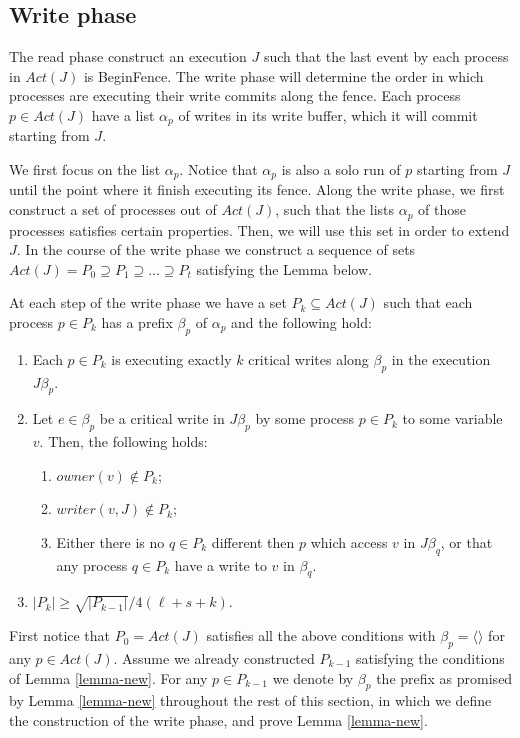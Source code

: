 \newpage
\subsection{Write phase}
The read phase construct an execution $J$ such that the last event by each process in $Act(J)$ is BeginFence. The write phase will determine the order in which processes are executing their write commits along the fence. Each process $p \in Act(J)$ have a list $\alpha_p$ of writes in its write buffer, which it will commit starting from $J$.

We first focus on the list $\alpha_p$. Notice that $\alpha_p$ is also a solo run of $p$ starting from $J$ until the point where it finish executing its fence. Along the write phase, we first construct a set of processes out of $Act(J)$, such that the lists $\alpha_p$ of those processes satisfies certain properties. Then, we will use this set in order to extend $J$.
In the course of the write phase we construct a sequence of sets $Act(J) = P_0 \supseteq P_1 \supseteq \ldots \supseteq P_t$ satisfying the Lemma below.

\begin{lemma} \label{lemma-new}
	At each step of the write phase we have a set $P_k \subseteq Act(J)$ such that each process $p \in P_k$ has a prefix $\beta_p$ of $\alpha_p$ and the following hold:
	\begin{enumerate}[(1)]
		\item Each $p \in P_k$ is executing exactly $k$ critical writes along $\beta_p$ in the execution $J \beta_p$.
		\item Let $e \in \beta_p$ be a critical write in $J \beta_p$ by some process $p \in P_k$ to some variable $v$. Then, the following holds:
		\begin{enumerate}
			\item $owner(v) \notin P_k$;
			\item $writer(v,J) \notin P_k$;
			\item Either there is no $q \in P_k$ different then $p$ which access $v$ in $J \beta_q$, or that any process $q \in P_k$ have a write to $v$ in $\beta_q$.
		\end{enumerate}
		\item $|P_k| \geq \sqrt{|P_{k-1}|}/4(\ell+s+k)$.
	\end{enumerate}
\end{lemma}

First notice that $P_0=Act(J)$ satisfies all the above conditions with $\beta_p=\langle \rangle$ for any $p \in Act(J)$. Assume we already constructed $P_{k-1}$ satisfying the conditions of Lemma \ref{lemma-new}. For any $p \in P_{k-1}$ we denote by $\beta_p$ the prefix as promised by Lemma \ref{lemma-new} throughout the rest of this section, in which we define the construction of the write phase, and prove Lemma \ref{lemma-new}.

